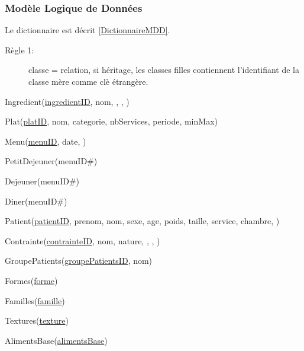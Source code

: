 \subsubsection{Modèle Logique de Données}
Le dictionnaire est décrit \autoref{DictionnaireMDD}.
\begin{description}
\item[Règle 1:] classe = relation, si héritage, les classes filles contiennent l'identifiant de la classe mère comme clè étrangère.
\end{description}

Ingredient(\underline{ingredientID}, nom, , , )


Plat(\underline{platID}, nom, categorie, nbServices, periode, minMax)


Menu(\underline{menuID}, date, )

PetitDejeuner(menuID\#)

Dejeuner(menuID\#)

Diner(menuID\#)

Patient(\underline{patientID}, prenom, nom, sexe, age, poids, taille, service, chambre, )


Contrainte(\underline{contrainteID}, nom, nature, , , )


GroupePatients(\underline{groupePatientsID}, nom)

Formes(\underline{forme})

Familles(\underline{famille})

Textures(\underline{texture})

AlimentsBase(\underline{alimentsBase})


